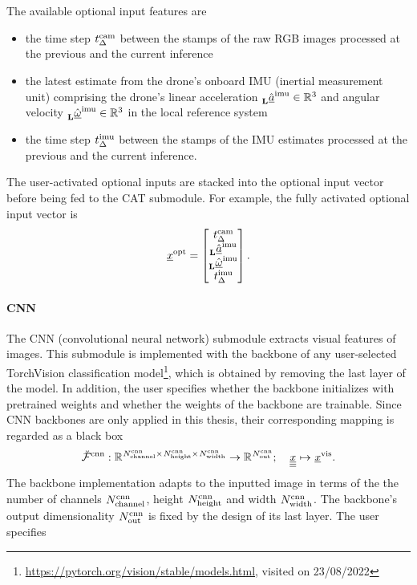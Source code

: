 The available optional input features are
\begin{itemize}
    \item the time step
    $\rawRGBTimeStep$
    between the stamps of the raw RGB images processed
    at the previous and the current inference
    \item the latest estimate from the drone's onboard IMU
    (inertial measurement unit) 
    comprising the drone's linear acceleration
    $\IMULinAcc \in \R{3}$
    and angular velocity
    $\IMUAngVel \in \R{3}$
    in the local reference system
    \item the time step
    $\IMUTimeStep$
    between the stamps of the IMU estimates
    processed at the previous and the current inference.
\end{itemize}
The user-activated optional inputs are stacked into the optional input vector
before being fed to the CAT submodule.
For example, the fully activated optional input vector is
\begin{align} \label{eq:opt_inp_vec}
    \optFeatVec{} =
    \begin{bmatrix}
        \rawRGBTimeStep \\
        \IMULinAcc \\
        \IMUAngVel \\
        \IMUTimeStep
    \end{bmatrix}.
\end{align}








\paragraph*{CNN} ${}$\\
The CNN (convolutional neural network) submodule 
extracts visual features of images.
This submodule is implemented with the backbone
of any user-selected TorchVision
classification model\footnote{
    \url{https://pytorch.org/vision/stable/models.html}, visited on 23/08/2022
},
which is obtained by removing the last layer of the model.
In addition, the user specifies whether the backbone
initializes with pretrained weights and whether
the weights of the backbone are trainable.
Since CNN backbones are only applied in this thesis, 
their corresponding mapping is 
regarded as a black box 
\begin{align} \label{eq:CNN}
    \CNNMap 
    :
    \R{\CNNNumC \times \CNNHeight \times \CNNWidth} 
    \rightarrow 
    \R{\CNNOutp}
    ;\quad 
    \img[]{}{}{}{}
    \mapsto 
    \visFeatVec{}
    .
\end{align}
The backbone implementation adapts to the inputted image
in terms of the 
the number of channels $\CNNNumC$,
height $\CNNHeight$
and width $\CNNWidth$.
The backbone's output dimensionality 
$\CNNOutp$
is fixed by the design of its last layer.
The user specifies

